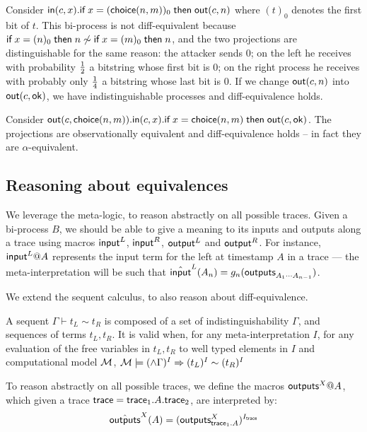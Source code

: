 \begin{example} \label{ex:sync}
  Consider
  $\mathsf{in}(c,x).\textsf{if}\; x=(\mathsf{choice}(n,m))_0 \;\textsf{then}\; \mathsf{out}(c,n)$
  where $(t)_0$ denotes the first bit of $t$.
  This bi-process is not diff-equivalent because
  $\textsf{if}\; x=(n)_0 \;\textsf{then}\; n \not\sim \textsf{if}\; x=(m)_0 \;\textsf{then}\; n$, and
  the two projections are distinguishable for the same
  reason: the attacker sends $0$;
  on the left he receives with probability $1\over 2$ a bitstring whose
  first bit is $0$;
  on the right process he receives with probably only $1\over 4$
  a bitstring whose last bit is $0$.
  If we change $\mathsf{out}(c,n)$ into $\mathsf{out}(c,\mathsf{ok})$,
  we have indistinguishable processes and diff-equivalence holds.
\end{example}

\begin{example} \label{ex:problem}
  Consider $\mathsf{out}(c,\mathsf{choice}(n,m)).
  \mathsf{in}(c,x).
  \textsf{if}\; x=\mathsf{choice}(n,m) \;\textsf{then}\; \mathsf{out}(c,\mathsf{ok})$.
  The projections are observationally equivalent and diff-equivalence
  holds -- in fact they are $\alpha$-equivalent.
\end{example}


\subsection{Reasoning about equivalences}

We leverage the meta-logic, to reason abstractly on all possible traces.
Given a bi-process $B$, we should be able to give a meaning to its inputs
and outputs along a trace using macros $\textsf{input}^L$, $\textsf{input}^R$, $\textsf{output}^L$
and $\textsf{output}^R$. For instance, $\textsf{input}^L@A$ represents the input term for
the left at timestamp $A$ in a trace --- the meta-interpretation will
be such that
$\hat{\textsf{input}}^L(A_n) = g_n( \textsf{outputs}_{A_1\cdots A_{n-1}})$.

We extend the sequent calculus, to also reason about diff-equivalence.

\begin{definition}
  A sequent $\Gamma \vdash t_L \sim t_R $ is composed of a set of indistinguishability $\Gamma$, and sequences of terms $t_L,t_R$.
  It is valid when, for any meta-interpretation $I$, for any evaluation of the free variables in $t_L,t_R$ to well typed elements in $I$ and computational model $\mathcal{M}$, $\mathcal{M} \models (\wedge \Gamma)^I \Rightarrow (t_L)^I \sim  (t_R)^I $
\end{definition}

To reason abstractly on all possible traces, we define the macros $\textsf{outputs}^X@A$, which given a trace $\textsf{trace} = \textsf{trace}_1 . A . \textsf{trace}_2$, are interpreted by:
$$\hat{\textsf{outputs}}^X(A) = (\textsf{outputs}_{\textsf{trace}_1.A}^X)^{I_{\textsf{trace}}} $$

